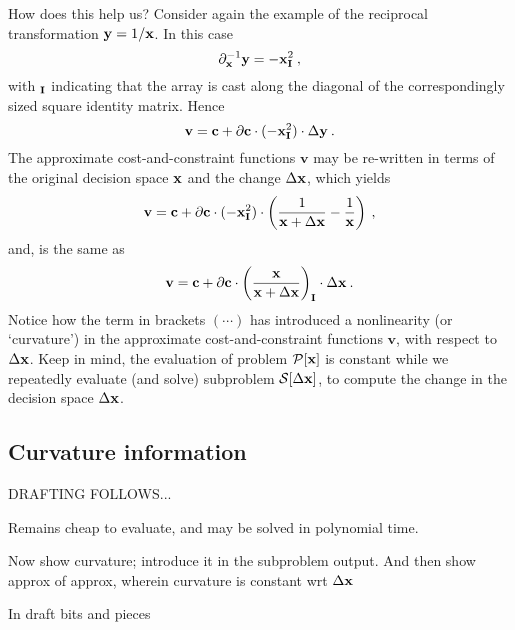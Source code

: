 \documentclass[11pt]{article}
\begin{document}
How does this help us? Consider again the example of the reciprocal transformation $\mathbf{y} = 1/ \mathbf{x}$. In this case
\begin{equation}
\partial_{\mathbf{x}}^{-1} \mathbf{y} = - \mathbf{x}_{\mathbf{I}}^2   \: ,
\end{equation}
with $_{\mathbf{I}}$ indicating that the array is cast along the diagonal of the correspondingly sized square identity matrix. Hence
\begin{equation}
    \textbf{v} = \mathbf{c} + \partial \mathbf{c}  \cdot (-\mathbf{x}_{\mathbf{I}}^2) \cdot \Delta \mathbf{y}  \:.
\end{equation}
The approximate cost-and-constraint functions $\textbf{v}$ may be re-written in terms of the original decision space $\mathbf{x}$ and the change $\Delta \mathbf{x}$, which yields
\begin{equation}
    \textbf{v} = \mathbf{c} + \partial \mathbf{c} \cdot (-\mathbf{x}_{\mathbf{I}}^2)  \cdot \left( \frac{1}{ \mathbf{x} + \Delta\mathbf{x}} - \frac{1}{\mathbf{x}} \right)   \:,
\end{equation}
and, is the same as
\begin{equation}
    \textbf{v} = \mathbf{c} + \partial \mathbf{c}  \cdot \left( \frac{\mathbf{x}}{\mathbf{x} + \Delta \mathbf{x}} \right)_{\mathbf{I}}\cdot \Delta \mathbf{x}   \:.
\end{equation}
Notice how the term in brackets $(\cdots)$ has introduced a nonlinearity (or `curvature') in the approximate cost-and-constraint functions $\textbf{v}$, with respect to $\Delta \mathbf{x}$. Keep in mind, the evaluation of problem $\mathcal{P} [\mathbf{x}]$ is constant while we repeatedly evaluate (and solve) subproblem $\mathcal{S}[\Delta \mathbf{x}]$, to compute the change in the decision space $\Delta \mathbf{x}$. 

\subsection{Curvature information}

\bigskip

DRAFTING FOLLOWS...

\bigskip

Remains cheap to evaluate, and may be solved in polynomial time.

Now show curvature; introduce it in the subproblem output. And then show approx of approx, wherein curvature is constant wrt $\Delta \mathbf{x}$

\newpage

In draft bits and pieces
\end{document}
